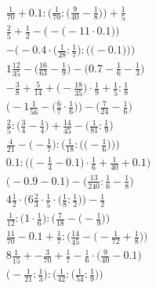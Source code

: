 \documentclass[8pt]{article}
\begin{document}
\begin{align}
\frac{1}{70} + 0.1 : \Big(\frac{1}{70} : \big(\frac{9}{40} - \frac{1}{8}\big)\Big) + \frac{1}{5} \\
\frac{2}{5} + \frac{1}{2} - \Big(-\big(-11 \cdot 0.1\big)\Big) \\
-\bigg(-0.4 \cdot \Big(\frac{1}{28} : \frac{1}{7}\Big) : \Big(\big(-0.1\big)\Big)\bigg) \\
1\frac{12}{35} - \big(\frac{16}{63} - \frac{1}{9}\big) - \big(0.7 - \frac{1}{6} - \frac{1}{3}\big) \\
-\frac{3}{8} + \frac{5}{14} + \big(-\frac{18}{35}\big) \cdot \frac{1}{9} + \frac{1}{5} : \frac{1}{8} \\
\Big(-1\frac{1}{56} - \big(\frac{6}{7} \cdot \frac{1}{6}\big)\Big) - \Big(\frac{7}{24} - \frac{1}{6}\Big) \\
\frac{2}{5} : \big(\frac{3}{4} - \frac{1}{4}\big) + \frac{14}{45} - \big(\frac{1}{81} : \frac{1}{9}\big) \\
\frac{4}{21} - \bigg(-\frac{1}{7}\bigg) : \bigg(\frac{1}{18} : \Big(\big(-\frac{1}{6}\big)\Big)\bigg) \\
0.1 : \Big(\big(-\frac{1}{4} - 0.1\big) \cdot \frac{1}{6} + \frac{1}{40} + 0.1\Big) \\
\big(-0.9 - 0.1\big) - \big(\frac{13}{240} : \frac{1}{6} - \frac{1}{8}\big) \\
4\frac{1}{2} \cdot \Big(6\frac{2}{3} \cdot \frac{1}{5} \cdot \big(\frac{1}{8} : \frac{1}{2}\big)\Big) - \frac{1}{2} \\
\frac{1}{12} : \Big(1 \cdot \frac{1}{6}\Big) : \Big(\frac{7}{18} - \big(-\frac{1}{9}\big)\Big) \\
\frac{11}{70} - 0.1 + \frac{1}{7} : \Big(\frac{14}{45} - \big(-\frac{1}{72} + \frac{1}{8}\big)\Big) \\
8\frac{1}{15} + -\frac{3}{70} + \frac{1}{7} - \frac{1}{6} \cdot \big(\frac{9}{40} - 0.1\big) \\
\Big(-\frac{1}{21} : \frac{1}{3}\Big) : \Big(\frac{1}{42} : \big(\frac{1}{54} : \frac{1}{9}\big)\Big)
\end{align}
\end{document}
